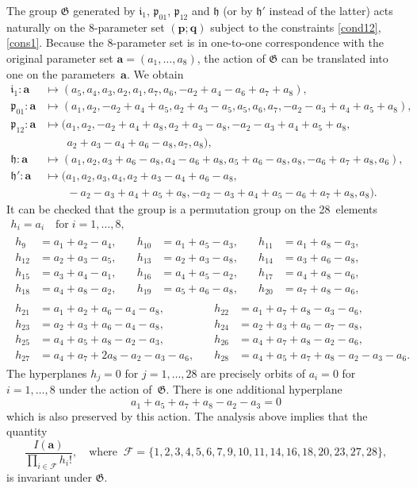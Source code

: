\documentclass[12pt,reqno]{amsart}
\theoremstyle{remark}
\newcommand\ba{\boldsymbol a}
\newcommand\bp{\boldsymbol p}
\newcommand\bq{\boldsymbol q}
\newcommand\cF{\mathcal F}
\newcommand\frG{\mathfrak G}
\newcommand\fri{\mathfrak i}
\newcommand\frh{\mathfrak h}
\newcommand\frp{\mathfrak p}
\begin{document}
The group $\frG$ generated by $\fri_1$, $\frp_{01}$, $\frp_{12}$ and $\frh$ (or by $\frh'$ instead of the latter) acts naturally on the 8-parameter set $(\bp;\bq)$ subject to the constraints \eqref{cond12}, \eqref{cons1}.
Because the 8-parameter set is in one-to-one correspondence with the original parameter set $\ba=(a_1,\dots,a_8)$, the action of $\frG$ can be translated into one on the parameters~$\ba$.
We obtain
\begin{align*}
\fri_1\colon\ba&\mapsto(a_5,a_4,a_3,a_2,a_1,a_7,a_6,-a_2+a_4-a_6+a_7+a_8),
\\
\frp_{01}\colon\ba&\mapsto(a_1,a_2,-a_2+a_4+a_5,a_2+a_3-a_5,a_5,a_6,a_7,-a_2-a_3+a_4+a_5+a_8),
\\
\frp_{12}\colon\ba&\mapsto(a_1,a_2,-a_2+a_4+a_8,a_2+a_3-a_8,-a_2-a_3+a_4+a_5+a_8,
\\ &\qquad
a_2+a_3-a_4+a_6-a_8,a_7,a_8),
\\
\frh\colon\ba&\mapsto(a_1,a_2,a_3+a_6-a_8,a_4-a_6+a_8,a_5+a_6-a_8,a_8,-a_6+a_7+a_8,a_6),
\\
\frh'\colon\ba&\mapsto(a_1,a_2,a_3,a_4,a_2+a_3-a_4+a_6-a_8,
\\ &\qquad
-a_2-a_3+a_4+a_5+a_8,-a_2-a_3+a_4+a_5-a_6+a_7+a_8,a_8).
\end{align*}
It can be checked that the group is a permutation group on the 28~elements
\begin{equation}
\begin{gathered}
h_i=a_i \quad\text{for}\; i=1,\dots,8,
\\
\begin{alignedat}{3}
h_9&=a_1+a_2-a_4, &\quad
h_{10}&=a_1+a_5-a_3, &\quad
h_{11}&=a_1+a_8-a_3, \\
h_{12}&=a_2+a_3-a_5, &\quad
h_{13}&=a_2+a_3-a_8, &\quad
h_{14}&=a_3+a_6-a_8, \\
h_{15}&=a_3+a_4-a_1, &\quad
h_{16}&=a_4+a_5-a_2, &\quad
h_{17}&=a_4+a_8-a_6, \\
h_{18}&=a_4+a_8-a_2, &\quad
h_{19}&=a_5+a_6-a_8, &\quad
h_{20}&=a_7+a_8-a_6,
\end{alignedat}
\\
\begin{alignedat}{2}
h_{21}&=a_1+a_2+a_6-a_4-a_8, &\quad
h_{22}&=a_1+a_7+a_8-a_3-a_6, \\
h_{23}&=a_2+a_3+a_6-a_4-a_8, &\quad
h_{24}&=a_2+a_3+a_6-a_7-a_8, \\
h_{25}&=a_4+a_5+a_8-a_2-a_3, &\quad
h_{26}&=a_4+a_7+a_8-a_2-a_6, \\
h_{27}&=a_4+a_7+2a_8-a_2-a_3-a_6, &\quad
h_{28}&=a_4+a_5+a_7+a_8-a_2-a_3-a_6.
\end{alignedat}
\end{gathered}
\label{eq:h}
\end{equation}
The hyperplanes $h_j=0$ for $j=1,\dots,28$ are precisely orbits of $a_i=0$ for $i=1,\dots,8$ under the action of~$\frG$. There is one additional  hyperplane
\[
a_1+a_5+a_7+a_8-a_2-a_3=0
\]
which is also 
 preserved by this action.
The analysis above implies that the quantity
\begin{equation}
\frac{I(\ba)}{\prod_{i\in\cF}h_i!},
\quad\text{where}\;\;
\cF=\{1,2,3,4,5,6,7,9,10,11,14,16,18,20,23,27,28\},
\label{F17}
\end{equation}
is invariant under $\frG$.
\end{document}
